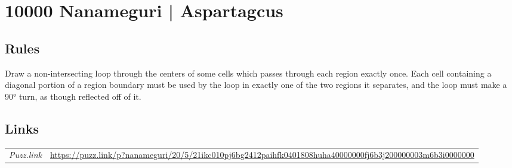 \section[10000 Nanameguri | Aspartagcus {[\emph{Nanameguri}]}]{10000 Nanameguri | {\normalfont Aspartagcus}}
\label{sec:35-10000-nanameguri-aspartagcus}

\subsection*{Rules}
\begin{markdown}
Draw a non-intersecting loop through the centers of some cells which passes through each region exactly once. Each cell containing a diagonal portion of a region boundary must be used by the loop in exactly one of the two regions it separates, and the loop must make a 90° turn, as though reflected off of it.
\end{markdown}
\subsection*{Links}
\begin{tabularx}{\textwidth}{l X}
\emph{Puzz.link} & \url{https://puzz.link/p?nanameguri/20/5/21ikc010pj6bg2412paihfk0401808huha40000000fj6b3j200000003m6b3i0000000} \\
\end{tabularx}
\pagebreak
